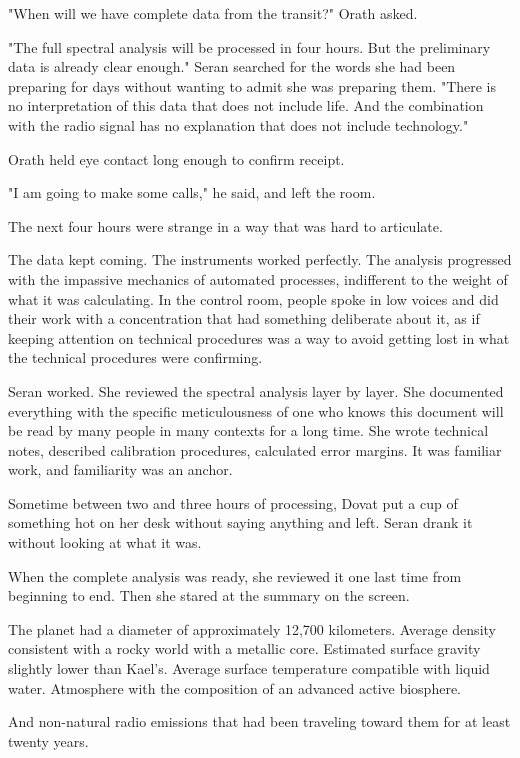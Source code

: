 \documentclass[11pt,a5paper,twoside]{book}
\begin{document}
"When will we have complete data from the transit?" Orath asked.

"The full spectral analysis will be processed in four hours. But the preliminary data is already clear enough." Seran searched for the words she had been preparing for days without wanting to admit she was preparing them. "There is no interpretation of this data that does not include life. And the combination with the radio signal has no explanation that does not include technology."

Orath held eye contact long enough to confirm receipt.

"I am going to make some calls," he said, and left the room.

The next four hours were strange in a way that was hard to articulate.

The data kept coming. The instruments worked perfectly. The analysis progressed with the impassive mechanics of automated processes, indifferent to the weight of what it was calculating. In the control room, people spoke in low voices and did their work with a concentration that had something deliberate about it, as if keeping attention on technical procedures was a way to avoid getting lost in what the technical procedures were confirming.

Seran worked. She reviewed the spectral analysis layer by layer. She documented everything with the specific meticulousness of one who knows this document will be read by many people in many contexts for a long time. She wrote technical notes, described calibration procedures, calculated error margins. It was familiar work, and familiarity was an anchor.

Sometime between two and three hours of processing, Dovat put a cup of something hot on her desk without saying anything and left. Seran drank it without looking at what it was.

When the complete analysis was ready, she reviewed it one last time from beginning to end. Then she stared at the summary on the screen.

The planet had a diameter of approximately 12,700 kilometers. Average density consistent with a rocky world with a metallic core. Estimated surface gravity slightly lower than Kael's. Average surface temperature compatible with liquid water. Atmosphere with the composition of an advanced active biosphere.

And non-natural radio emissions that had been traveling toward them for at least twenty years.
\end{document}
